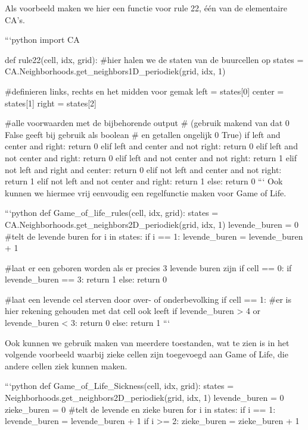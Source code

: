 \documentclass{article}
\begin{document}
\begin{markdown}
Als voorbeeld maken we hier een functie voor rule 22, één van de elementaire CA's. 

```python
import CA

def rule22(cell, idx, grid):
    #hier halen we de staten van de buurcellen op
    states = CA.Neighborhoods.get_neighbors1D_periodiek(grid, idx, 1)

    #definieren links, rechts en het midden voor gemak
    left = states[0]
    center = states[1]
    right = states[2]
    
    #alle voorwaarden met de bijbehorende output 
    # (gebruik makend van dat 0 False geeft bij gebruik als boolean
    # en getallen ongelijk 0 True)
    if left and center and right:
        return 0
    elif left and center and not right:
        return 0
    elif left and not center and right:
        return 0
    elif left and not center and not right:
        return 1
    elif not left and right and center:
        return 0
    elif not left and center and not right:
        return 1
    elif not left and not center and right:
        return 1
    else: 
        return 0
```
Ook kunnen we hiermee vrij eenvoudig een regelfunctie maken voor Game of Life. 

```python
def Game_of_life_rules(cell, idx, grid):
        states = CA.Neighborhoods.get_neighbors2D_periodiek(grid, idx, 1)
        levende_buren = 0
        #telt de levende buren 
        for i in states: 
                if i == 1:
                    levende_buren = levende_buren + 1
        
        #laat er een geboren worden als er precies 3 levende buren zijn          
        if cell == 0: 
            if levende_buren == 3: 
                return 1
            else:
                return 0
        

        #laat een levende cel sterven door over- of onderbevolking   
        if cell == 1: 
            #er is hier rekening gehouden met dat cell ook leeft
            if levende_buren > 4 or levende_buren < 3: 
                return 0
            else:
                return 1
```

Ook kunnen we gebruik maken van meerdere toestanden, wat te zien is in het volgende voorbeeld waarbij zieke cellen zijn toegevoegd aan Game of Life, die andere cellen ziek kunnen maken.

```python
def Game_of_Life_Sickness(cell, idx, grid):
    states = Neighborhoods.get_neighbors2D_periodiek(grid, idx, 1)
    levende_buren = 0
    zieke_buren = 0
    #telt de levende en zieke buren 
    for i in states: 
        if i == 1:
            levende_buren = levende_buren + 1
        if i >= 2:
            zieke_buren = zieke_buren + 1


\end{markdown}
\end{document}
